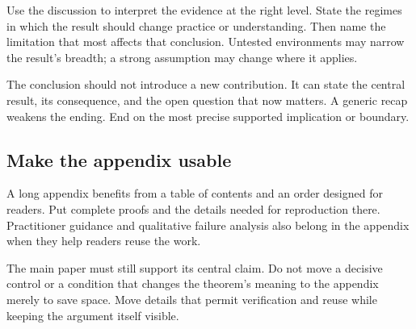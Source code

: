 Use the discussion to interpret the evidence at the right level. State the
regimes in which the result should change practice or understanding. Then name
the limitation that most affects that conclusion. Untested environments may
narrow the result's breadth; a strong assumption may change where it applies.

The conclusion should not introduce a new contribution. It can state the
central result, its consequence, and the open question that now matters. A
generic recap weakens the ending. End on the most precise supported implication
or boundary.

\subsection{Make the appendix usable}

A long appendix benefits from a table of contents and an order designed for
readers. Put complete proofs and the details needed for reproduction there.
Practitioner guidance and qualitative failure analysis also belong in the
appendix when they help readers reuse the work.

The main paper must still support its central claim. Do not move a decisive
control or a condition that changes the theorem's meaning to the appendix
merely to save space. Move details that permit verification and reuse while
keeping the argument itself visible.
